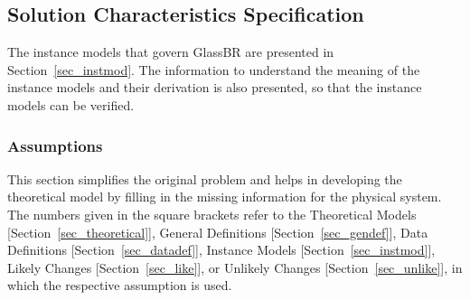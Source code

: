 \documentclass[12pt]{article}
\newcommand{\progname}{GlassBR}
\begin{document}
\subsection{Solution Characteristics Specification}

The instance models that govern \progname{} are presented in Section~\ref{sec_instmod}. The information
to understand the meaning of the instance models and their derivation is also presented, so
that the instance models can be verified.

\subsubsection{Assumptions} \label{Assumptions}

This section simplifies the original problem and helps in developing the
theoretical model by filling in the missing information for the physical
system. The numbers given in the square brackets refer to the Theoretical 
Models [Section~\ref{sec_theoretical}], General Definitions 
[Section~\ref{sec_gendef}], Data Definitions [Section~\ref{sec_datadef}], Instance
Models [Section~\ref{sec_instmod}], Likely Changes [Section~\ref{sec_like}],
or Unlikely Changes [Section~\ref{sec_unlike}], in which the respective 
assumption is used.
\end{document}
